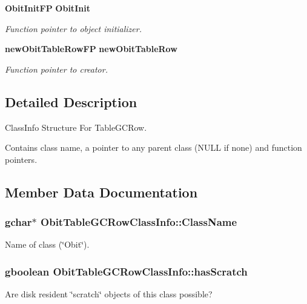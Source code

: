 \begin{CompactItemize}
{\bf Obit\-Init\-FP} {\bf Obit\-Init}
\begin{CompactList}\small\item\em Function pointer to object initializer. \item\end{CompactList}\item 
{\bf new\-Obit\-Table\-Row\-FP} {\bf new\-Obit\-Table\-Row}
\begin{CompactList}\small\item\em Function pointer to creator. \item\end{CompactList}\end{CompactItemize}


\subsection{Detailed Description}
Class\-Info Structure For Table\-GCRow. 

Contains class name, a pointer to any parent class (NULL if none) and function pointers. 



\subsection{Member Data Documentation}
\subsubsection{\setlength{\rightskip}{0pt plus 5cm}gchar$\ast$ {\bf Obit\-Table\-GCRow\-Class\-Info::Class\-Name}}\label{structObitTableGCRowClassInfo_o2}


Name of class (\char`\"{}Obit\char`\"{}). 

\subsubsection{\setlength{\rightskip}{0pt plus 5cm}gboolean {\bf Obit\-Table\-GCRow\-Class\-Info::has\-Scratch}}\label{structObitTableGCRowClassInfo_o1}


Are disk resident \char`\"{}scratch\char`\"{} objects of this class possible? 

